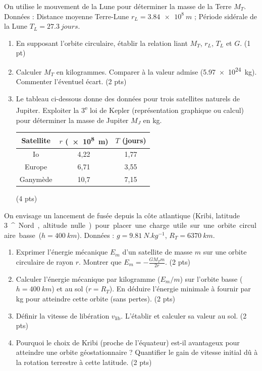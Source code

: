 \documentclass[11pt]{article}
\providecommand{\degree}{^{\circ}}
\begin{document}
\begin{exercice}
On utilise le mouvement de la Lune pour déterminer la masse de la Terre $M_T$.
Données : Distance moyenne Terre-Lune $r_L = \SI{3,84e8}{m}$ ; Période sidérale de la Lune $T_L = \SI{27,3}{jours}$.
\begin{enumerate}
    \item En supposant l'orbite circulaire, établir la relation liant $M_T$, $r_L$, $T_L$ et $G$. (1 pt)
    \item Calculer $M_T$ en kilogrammes. Comparer à la valeur admise (\SI{5,97e24}{kg}). Commenter l'éventuel écart. (2 pts)
    \item Le tableau ci-dessous donne des données pour trois satellites naturels de Jupiter. Exploiter la 3\textsuperscript{e} loi de Kepler (représentation graphique ou calcul) pour déterminer la masse de Jupiter $M_J$ en kg.
    \begin{center}
    \begin{tabular}{|c|c|c|}
    \hline
    Satellite & $r$ (\SI{e8}{m}) & $T$ (jours) \\
    \hline
    Io & 4,22 & 1,77 \\
    Europe & 6,71 & 3,55 \\
    Ganymède & 10,7 & 7,15 \\
    \hline
    \end{tabular}
    \end{center}
    (4 pts)
\end{enumerate}
\end{exercice}

\begin{exercice}
On envisage un lancement de fusée depuis la côte atlantique (Kribi, latitude \SI{3}{\degree} Nord, altitude nulle) pour placer une charge utile sur une orbite circulaire basse ($h = \SI{400}{km}$).
Données : $g = \SI{9,81}{N.kg^{-1}}$, $R_T = \SI{6370}{km}$.
\begin{enumerate}
    \item Exprimer l'énergie mécanique $E_m$ d'un satellite de masse $m$ sur une orbite circulaire de rayon $r$. Montrer que $E_m = -\frac{GM_T m}{2r}$. (2 pts)
    \item Calculer l'énergie mécanique par kilogramme ($E_m/m$) sur l'orbite basse ($h=\SI{400}{km}$) et au sol ($r=R_T$). En déduire l'énergie minimale à fournir par kg pour atteindre cette orbite (sans pertes). (2 pts)
    \item Définir la vitesse de libération $v_{\text{lib}}$. L'établir et calculer sa valeur au sol. (2 pts)
    \item Pourquoi le choix de Kribi (proche de l'équateur) est-il avantageux pour atteindre une orbite géostationnaire ? Quantifier le gain de vitesse initial dû à la rotation terrestre à cette latitude. (2 pts)
\end{enumerate}
\end{exercice}
\end{document}
